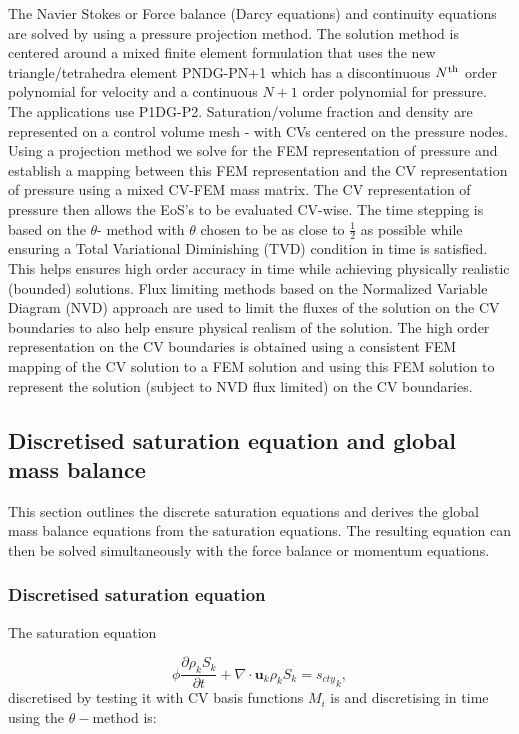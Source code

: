 The Navier Stokes or Force balance (Darcy equations) and continuity 
equations are solved by using a pressure projection method. 
The solution method is centered around a mixed finite element formulation 
that uses the new triangle/tetrahedra element PNDG-PN+1 which has a discontinuous $N^{\rm th}$ order polynomial for velocity and a continuous $N+1$ order polynomial for pressure. The applications use P1DG-P2. 
Saturation/volume fraction 
and density are represented on a control volume mesh - with CVs centered on the pressure nodes. 
Using a projection method we solve for the FEM representation of 
pressure and establish a mapping between this FEM representation 
and the CV representation of pressure using a mixed CV-FEM mass 
matrix. The CV representation of pressure then allows 
 the EoS's to be evaluated CV-wise. 
The time stepping is based on the $\theta$- method with 
$\theta$ chosen to be as close to $\frac{1}{2}$ as possible 
while ensuring a Total Variational Diminishing (TVD) 
condition in time is satisfied. 
This helps ensures high order 
accuracy in time while achieving physically realistic (bounded) 
solutions. Flux limiting methods based on the Normalized Variable 
Diagram (NVD) approach 
are used to limit the fluxes of the solution 
on the CV boundaries to also 
help ensure physical realism of the solution. 
The high order representation on the CV boundaries is 
obtained using a consistent FEM mapping of the CV 
solution to a FEM solution and using this FEM solution 
to represent the solution (subject to NVD flux limited) on the CV boundaries.  



\subsection{Discretised saturation equation and global mass balance} 

This section outlines the discrete saturation equations and derives the global mass balance equations from the saturation equations. The resulting equation can then be solved simultaneously with the force balance or momentum equations. 
										

\subsubsection{Discretised saturation equation} 

The saturation equation 

\begin{equation}
\phi\frac{\partial \rho_k S_k }{\partial t} 
+ \nabla \cdot {\mathbf u}_k \rho_k S_k = {s_{cty}}_k, 
\end{equation}
discretised by testing it with CV basis functions 
 $M_i$ is and discretising in time using the 
 $\theta-$method is:
 
